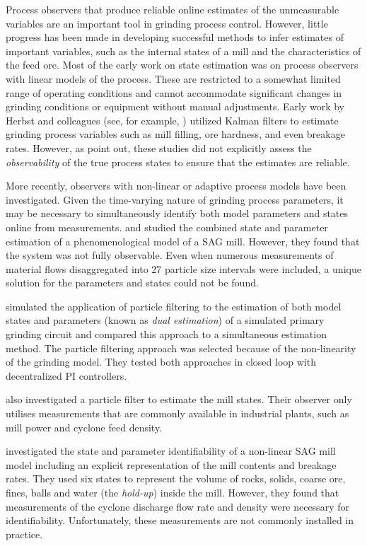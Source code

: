 Process observers that produce reliable online estimates of the unmeasurable variables are an important tool in grinding process control. However, little progress has been made in developing successful methods to infer estimates of important variables, such as the internal states of a mill and the characteristics of the feed ore. Most of the early work on state estimation was on process observers with linear models of the process. These are restricted to a somewhat limited range of operating conditions and cannot accommodate significant changes in grinding conditions or equipment without manual adjustments. Early work by Herbst and colleagues (see, for example, \cite{herbst_model-based_1992}) utilized Kalman filters to estimate grinding process variables such as mill filling, ore hardness, and even breakage rates. However, as \cite{le_roux_ekf_2017} point out, these studies did not explicitly assess the \textit{observability} of the true process states to ensure that the estimates are reliable.

More recently, observers with non-linear or adaptive process models have been investigated. Given the time-varying nature of grinding process parameters, it may be necessary to simultaneously identify both model parameters and states online from measurements. \cite{apelt_inferential_2002} and \cite{apelt_inferential_2002-1} studied the combined state and parameter estimation of a phenomenological model of a \acrshort{SAG} mill. However, they found that the system was not fully observable. Even when numerous measurements of material flows disaggregated into 27 particle size intervals were included, a unique solution for the parameters and states could not be found.

\cite{olivier_dual_2012} simulated the application of particle filtering to the estimation of both model states and parameters (known as \textit{dual estimation}) of a simulated primary grinding circuit and compared this approach to a simultaneous estimation method. The particle filtering approach was selected because of the non-linearity of the grinding model. They tested both approaches in closed loop with decentralized \gls{PI} controllers.

\cite{le_roux_throughput_2016} also investigated a particle filter to estimate the mill states. Their observer only utilises measurements that are commonly available in industrial plants, such as mill power and cyclone feed density.

\cite{le_roux_state_2016} investigated the state and parameter identifiability of a non-linear \acrshort{SAG} mill model including an explicit representation of the mill contents and breakage rates. They used six states to represent the volume of rocks, solids, coarse ore, fines, balls and water (the \textit{hold-up}) inside the mill. However, they found that measurements of the cyclone discharge flow rate and density were necessary for identifiability. Unfortunately, these measurements are not commonly installed in practice.

